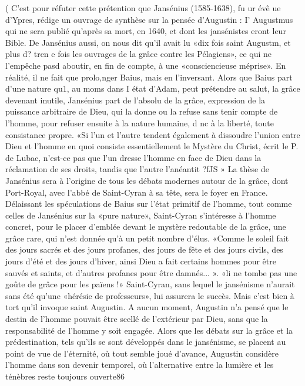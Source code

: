 (
C'est pour réfuter cette prétention que Jansénius (1585-1638), fu ur évê ue d'Ypres, rédige un ouvrage de synthèse sur la pensée d'Augustin : I' Augustmus qui ne sera publié qu'après sa mort, en 1640, et dont les jansénistes eront leur Bible. De Jansénius aussi, on nous dit qu'il avait lu «dix fois saint Augustm, et plus d? tren e fois les ouvrages de la grâce contre les Pélagiens», ce qui ne l'empêche pasd aboutir, en fin de compte, à une «consciencieuse méprise». En réalité, il ne fait que prolo,nger Baius, mais en l'inversant. Alors que Baius part d'une nature qu1, au moms dans I état d'Adam, peut prétendre au salut, la grâce devenant inutile, Jansénius part de l'absolu de la grâce, expression de la puissance arbitraire de Dieu, qui la donne ou la refuse sans tenir compte de l'homme, pour refuser ensuite à la nature humaine, d nc à la liberté, toute consistance propre. «Si l'un et l'autre tendent également à dissoudre l'union entre Dieu et l'homme en quoi consiste essentiellement le Mystère du Christ, écrit le P. de Lubac, n'est-ce pas que l'un dresse l'homme en face de Dieu dans la réclamation de ses droits, tandis que l'autre l'anéantit ?fJS »
La thèse de Jansénius sera à l'origine de tous les débats modernes autour de la grâce, dont Port-Royal,  avec l'abbé de Saint-Cyran à sa tête, sera le foyer en France. Délaissant les spéculations de Baius sur l'état primitif de l'homme, tout comme celles de Jansénius sur la «pure nature», Saint-Cyran s'intéresse à l'homme concret, pour le placer d'emblée devant le mystère redoutable de la grâce, une grâce rare, qui n'est donnée qu'à un petit nombre d'élus. «Comme le soleil fait des jours sacrés et des jours profanes, des jours de fête et des jours civils, des jours d'été et des jours d'hiver, ainsi Dieu a fait certains hommes pour être sauvés et saints, et d'autres profanes pour être damnés... ». «li ne tombe pas une goûte de grâce pour les païens !» Saint-Cyran, sans lequel le jansénisme n'aurait sans été qu'une «hérésie de professeurs», lui assurera le succès. Mais c'est bien à tort qu'il invoque saint Augustin. A aucun moment, Augustin n'a pensé que le destin de l'homme pouvait être scellé de l'extérieur par Dieu, sans que la responsabilité de l'homme y soit engagée. Alors que les débats sur la grâce et la prédestination, tels qu'ils se sont développés dans le jansénisme, se placent au point de vue de l'éternité, où tout semble joué d'avance, Augustin considère l'homme dans son devenir temporel, où l'alternative entre la lumière et les ténèbres reste toujours ouverte86 

